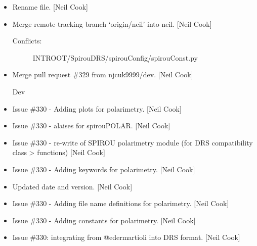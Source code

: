 \documentclass[a4paper,10pt,english]{report}
\begin{document}
\begin{itemize}
\item {} 
Rename file. {[}Neil Cook{]}

\item {} 
Merge remote-tracking branch ‘origin/neil’ into neil. {[}Neil Cook{]}
\begin{description}
\item[{Conflicts:}] \leavevmode
INTROOT/SpirouDRS/spirouConfig/spirouConst.py

\end{description}

\item {} 
Merge pull request \#329 from njcuk9999/dev. {[}Neil Cook{]}

Dev

\item {} 
Issue \#330 - Adding plots for polarimetry. {[}Neil Cook{]}

\item {} 
Issue \#330 - alaises for spirouPOLAR. {[}Neil Cook{]}

\item {} 
Issue \#330 - re-write of SPIROU polarimetry module (for DRS
compatibility class \textendash{}\textgreater{} functions) {[}Neil Cook{]}

\item {} 
Issue \#330 - Adding keywords for polarimetry. {[}Neil Cook{]}

\item {} 
Updated date and version. {[}Neil Cook{]}

\item {} 
Issue \#330 - Adding file name definitions for polarimetry. {[}Neil Cook{]}

\item {} 
Issue \#330 - Adding constants for polarimetry. {[}Neil Cook{]}

\item {} 
Issue \#330: integrating  from @edermartioli into DRS format.
{[}Neil Cook{]}

\end{itemize}
\end{document}
